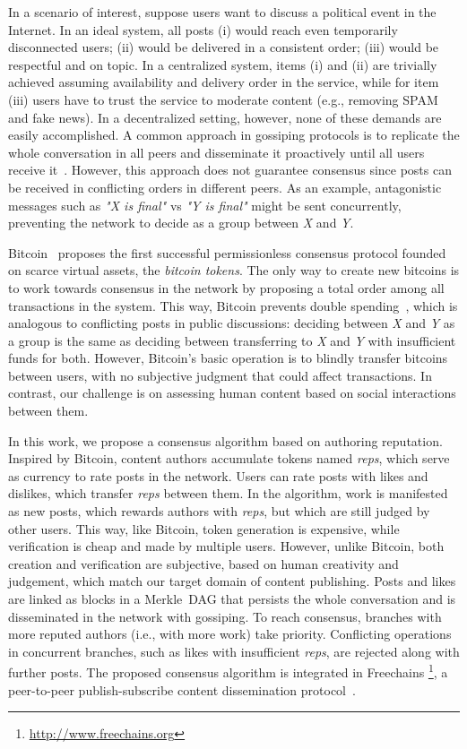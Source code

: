 \documentclass[10pt,journal,compsoc]{IEEEtran}
\newcommand{\reps}     {\emph{reps}\xspace}
\begin{document}
In a scenario of interest, suppose users want to discuss a political event in
the Internet.
In an ideal system, all posts
(i)   would reach even temporarily disconnected users;
(ii)  would be delivered in a consistent order;
(iii) would be respectful and on topic.
In a centralized system, items (i) and (ii) are trivially achieved assuming
availability and delivery order in the service, while for item (iii) users have
to trust the service to moderate content (e.g., removing SPAM and fake news).
In a decentralized setting, however, none of these demands are easily
accomplished.
A common approach in gossiping protocols is to replicate the whole conversation
in all peers and disseminate it proactively until all users receive
it~\cite{p2p.survey}.
However, this approach does not guarantee consensus since posts can be received
in conflicting orders in different peers.
As an example, antagonistic messages such as \emph{"X is final"} vs
\emph{"Y is final"} might be sent concurrently, preventing the network to
decide as a group between \emph{X} and \emph{Y}.

Bitcoin~\cite{p2p.bitcoin} proposes the first successful permissionless
consensus protocol founded on scarce virtual assets, the \emph{bitcoin tokens}.
%
The only way to create new bitcoins is to work towards consensus in the network
by proposing a total order among all transactions in the system.
%
This way, Bitcoin prevents double spending~\cite{p2p.bitcoin}, which is
analogous to conflicting posts in public discussions:
    deciding between \emph{X} and \emph{Y} as a group is the same as
    deciding between transferring to \emph{X} and \emph{Y} with insufficient
    funds for both.
%
However, Bitcoin's basic operation is to blindly transfer bitcoins between
users, with no subjective judgment that could affect transactions.
In contrast, our challenge is on assessing human content based on social
interactions between them.

In this work, we propose a consensus algorithm based on authoring reputation.
Inspired by Bitcoin, content authors accumulate tokens named \reps, which serve
as currency to rate posts in the network.
Users can rate posts with likes and dislikes, which transfer \reps between
them.
In the algorithm, work is manifested as new posts, which rewards authors with
\reps, but which are still judged by other users.
This way, like Bitcoin, token generation is expensive, while verification is
cheap and made by multiple users.
However, unlike Bitcoin, both creation and verification are subjective, based
on human creativity and judgement, which match our target domain of content
publishing.
Posts and likes are linked as blocks in a Merkle~DAG that persists the whole
conversation and is disseminated in the network with gossiping.
To reach consensus, branches with more reputed authors (i.e., with more work)
take priority.
Conflicting operations in concurrent branches, such as likes with insufficient
\reps, are rejected along with further posts.
The proposed consensus algorithm is integrated in Freechains%
\footnote{\url{http://www.freechains.org}},
a peer-to-peer publish-subscribe content dissemination
protocol~\cite{fcs.sbseg20}.
\end{document}
